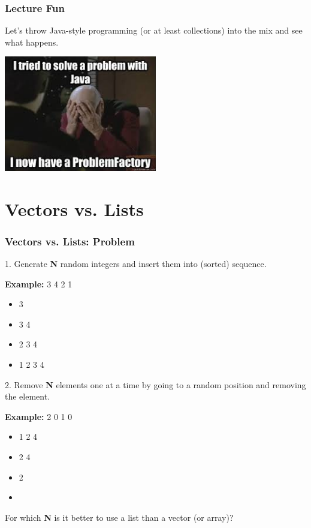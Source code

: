 \begin{frame}
  \frametitle{Lecture Fun}

  \begin{center}
\Large
    Let's throw Java-style programming (or at least collections) into the mix and see what happens.
    
    \begin{center}
	\includegraphics[width=0.5\textwidth]{images/problemfactory.jpeg}
	\end{center}
    
  \end{center}
\end{frame}

\section{Vectors vs. Lists}
\begin{frame}
  \frametitle{Vectors vs. Lists: Problem}
  
  

    1. Generate {\bf N} random integers and insert them into (sorted)
      sequence.
      
  

      {\bf Example:} 3 4 2 1
      
      \begin{itemize}
        \item 3
        \item 3 4
        \item 2 3 4
        \item 1 2 3 4
      \end{itemize}
  

    2. Remove {\bf N} elements one at a time by going to a random position
      and removing the element.

  
      {\bf Example:} 2 0 1 0
      
      \begin{itemize}
        \item 1 2 4
        \item 2 4
        \item 2
        \item 
      \end{itemize}
  
  For which {\bf N} is it better to use a list than a vector (or array)?
  

\end{frame}


